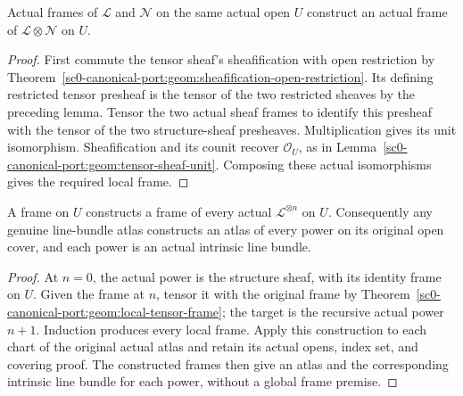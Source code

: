 \begin{theorem}
\label{sc0-canonical-port:geom:local-tensor-frame}
\leanok
Actual frames of \(\mathcal L\) and \(\mathcal N\)
on the same actual open \(U\) construct an actual frame
of \(\mathcal L\otimes\mathcal N\) on \(U\).
\end{theorem}
\begin{proof}
First commute the tensor sheaf's sheafification with open
restriction by Theorem~\ref{sc0-canonical-port:geom:sheafification-open-restriction}.
Its defining restricted tensor presheaf is the tensor of
the two restricted sheaves by the preceding lemma.
Tensor the two actual sheaf frames to identify this
presheaf with the tensor of the two structure-sheaf
presheaves. Multiplication gives its unit isomorphism.
Sheafification and its counit recover \(\mathcal O_U\),
as in Lemma~\ref{sc0-canonical-port:geom:tensor-sheaf-unit}. Composing these
actual isomorphisms gives the required local frame.
\end{proof}

\begin{theorem}
\label{sc0-canonical-port:geom:local-atlas-tensor-powers}
\leanok
A frame on \(U\) constructs a frame of every actual
\(\mathcal L^{\otimes n}\) on \(U\). Consequently any
genuine line-bundle atlas constructs an atlas of every
power on its original open cover, and each power is an
actual intrinsic line bundle.
\end{theorem}
\begin{proof}
At \(n=0\), the actual power is the structure sheaf, with
its identity frame on \(U\). Given the frame at \(n\),
tensor it with the original frame by
Theorem~\ref{sc0-canonical-port:geom:local-tensor-frame}; the target is the
recursive actual power \(n+1\). Induction produces every
local frame. Apply this construction to each chart of
the original actual atlas and retain its actual opens,
index set, and covering proof. The constructed frames
then give an atlas and the corresponding intrinsic line
bundle for each power, without a global frame premise.
\end{proof}

